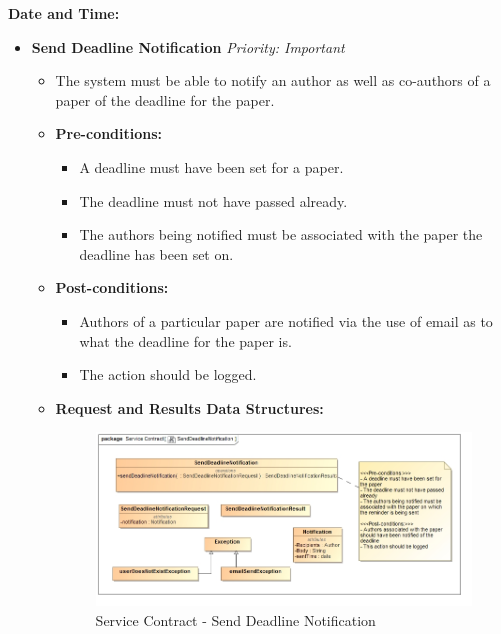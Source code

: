 \documentclass{article}
\begin{document}
				\cleardoublepage
				\textbf{\large{Date and Time:}}
				\begin{itemize}
					\item \textbf{Send Deadline Notification} \hfill \textit{Priority: Important}
					\begin{itemize}
						\item The system must be able to notify an author as well as co-authors of a paper of the deadline for the paper.
						\item \textbf{Pre-conditions:}
						\begin{itemize}
							\item A deadline must have been set for a paper.
							\item The deadline must not have passed already.
							\item The authors being notified must be associated with the paper the deadline has been set on.
						\end{itemize}
						\item \textbf{Post-conditions:}
						\begin{itemize}
							\item Authors of a particular paper are notified via the use of email as to what the deadline for the paper is.
							\item The action should be logged.
						\end{itemize}
						\item \textbf{Request and Results Data Structures:}
						\begin{figure}[H]
							\includegraphics[width=\linewidth]{../Diagrams/ServiceContracts/Notification subsystem/SendDeadlineNotification.jpg}
							\caption{Service Contract - Send Deadline Notification}
						\end{figure}
					\end{itemize}
					

\end{itemize}
\end{document}

